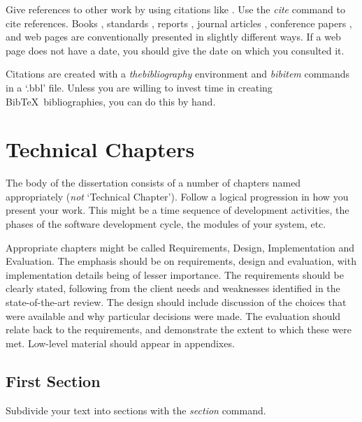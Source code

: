 \documentclass[a4paper,11pt]{report}
\begin{document}
Give references to other work by using citations like
\cite{Ji-Turner-1999c}. Use the \textit{{\bs}cite} command to cite references.
Books \cite{Greene-Williams-1997}, standards \cite{ISO-8807}, reports
\cite{Jacobson-Andersen-1997}, journal articles \cite{Turner-2007a}, conference
papers \cite{Ji-Turner-1999c}, and web pages \cite{Turner-2000a} are
conventionally presented in slightly different ways. If a web page does not have
a date, you should give the date on which you consulted it.

Citations are created with a {\it thebibliography} environment and
\textit{{\bs}bibitem} commands in a `.bbl' file. Unless you are willing to
invest time in creating Bib\TeX\ bibliographies, you can do this by hand.


\chapter{Technical Chapters}            %

\label{technical}

The body of the dissertation consists of a number of chapters named
appropriately ({\em not} `Technical Chapter'). Follow a logical progression in
how you present your work. This might be a time sequence of development
activities, the phases of the software development cycle, the modules of your
system, etc.

Appropriate chapters might be called Requirements, Design, Implementation and
Evaluation. The emphasis should be on requirements, design and evaluation, with
implementation details being of lesser importance. The requirements should be
clearly stated, following from the client needs and weaknesses identified in the
state-of-the-art review. The design should include discussion of the choices
that were available and why particular decisions were made. The evaluation
should relate back to the requirements, and demonstrate the extent to which
these were met. Low-level material should appear in appendixes.

\section{First Section}

\label{technical-section1}

Subdivide your text into sections with the \textit{{\bs}section} command.
\end{document}
